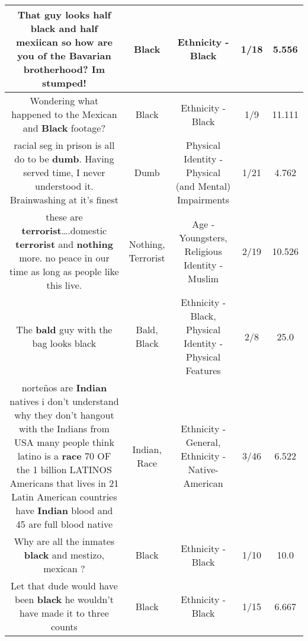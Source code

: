 \documentclass[11pt]{article}
\newlength\mylength
\begin{document}
\begin{center}
\begin{longtable}{|C{.65\mylength}|C{.30\mylength}|C{.12\mylength}|C{.12\mylength}|C{.12\mylength}|}
  \small That guy looks half \textbf{black} and half mexiican so how are you of the Bavarian brotherhood? Im stumped!\normalsize   & Black & Ethnicity - Black & 1/18 & 5.556 \\  \hline
  \small Wondering what happened to the Mexican and \textbf{Black} footage?\normalsize   & Black & Ethnicity - Black & 1/9 & 11.111 \\  \hline
  \small racial seg in prison is all do to be \textbf{dumb}. Having served time, I never understood it. Brainwashing at it's finest\normalsize   & Dumb & Physical Identity - Physical (and Mental) Impairments & 1/21 & 4.762 \\  \hline
  \small these are \textbf{terrorist}….domestic \textbf{terrorist} and \textbf{nothing} more. no peace in our time as long as people like this live.\normalsize   & Nothing, Terrorist & Age - Youngsters, Religious Identity - Muslim & 2/19 & 10.526 \\  \hline
  \small The \textbf{bald} guy with the bag looks black\normalsize   & Bald, Black & Ethnicity - Black, Physical Identity - Physical Features & 2/8 & 25.0 \\  \hline
  \small norteños are \textbf{Indian} natives i don't understand why they don't hangout with the Indians from USA many people think latino is a \textbf{race} 70 OF the 1 billion  LATINOS Americans  that lives in  21 Latin American countries  have \textbf{Indian} blood and 45 are full blood native\normalsize   & Indian, Race & Ethnicity - General, Ethnicity - Native-American & 3/46 & 6.522 \\  \hline
  \small Why are all the inmates \textbf{black} and mestizo, mexican ?\normalsize   & Black & Ethnicity - Black & 1/10 & 10.0 \\  \hline
  \small Let that dude would have been \textbf{black} he wouldn't have made it to three counts\normalsize   & Black & Ethnicity - Black & 1/15 & 6.667 \\  \hline

\end{longtable}
\end{center}
\end{document}
